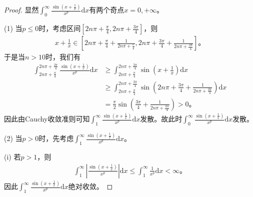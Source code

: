 \documentclass[../../main.tex]{subfiles}%
\begin{document}
\begin{proof}
显然\(\int_0^{\infty}{\frac{\sin \left( x+\frac{1}{x} \right)}{x^p}\mathrm{d}x}\)有两个奇点\(x=0,+\infty\)。

(1) 当\(p\leqslant 0\)时，考虑区间\(\left[ 2n\pi +\frac{\pi}{4},2n\pi +\frac{3\pi}{4} \right]\)，则
\begin{align*}
x+\frac{1}{x}\in \left[ 2n\pi +\frac{\pi}{4}+\frac{1}{2n\pi +\frac{\pi}{4}},2n\pi +\frac{3\pi}{4}+\frac{1}{2n\pi +\frac{3\pi}{4}} \right]。
\end{align*}
于是当\(n>10\)时，我们有
\begin{align*}
\int_{2n\pi +\frac{\pi}{4}}^{2n\pi +\frac{3\pi}{4}}{\frac{\sin \left( x+\frac{1}{x} \right)}{x^p}\mathrm{d}x}&\geqslant \int_{2n\pi +\frac{\pi}{4}}^{2n\pi +\frac{3\pi}{4}}{\sin \left( x+\frac{1}{x} \right) \mathrm{d}x}\\
&\geqslant \int_{2n\pi +\frac{\pi}{4}}^{2n\pi +\frac{3\pi}{4}}{\sin \left( 2n\pi +\frac{3\pi}{4}+\frac{1}{2n\pi +\frac{3\pi}{4}} \right) \mathrm{d}x}\\
&=\frac{\pi}{2}\sin \left( \frac{3\pi}{4}+\frac{1}{2n\pi +\frac{3\pi}{4}} \right) >0。
\end{align*}
因此由Cauchy收敛准则可知\(\int_1^{\infty}{\frac{\sin \left( x+\frac{1}{x} \right)}{x^p}\mathrm{d}x}\)发散。故此时\(\int_0^{\infty}{\frac{\sin \left( x+\frac{1}{x} \right)}{x^p}\mathrm{d}x}\)发散。

(2) 当\(p>0\)时，先考虑\(\int_1^{\infty}{\frac{\sin \left( x+\frac{1}{x} \right)}{x^p}\mathrm{d}x}\)。

(i) 若\(p>1\)，则
\begin{align*}
\int_1^{\infty}{\left| \frac{\sin \left( x+\frac{1}{x} \right)}{x^p} \right|\mathrm{d}x}\leqslant \int_1^{\infty}{\frac{1}{x^p}\mathrm{d}x}<\infty。
\end{align*}
因此\(\int_1^{\infty}{\frac{\sin \left( x+\frac{1}{x} \right)}{x^p}\mathrm{d}x}\)绝对收敛。


\end{proof}
\end{document}
